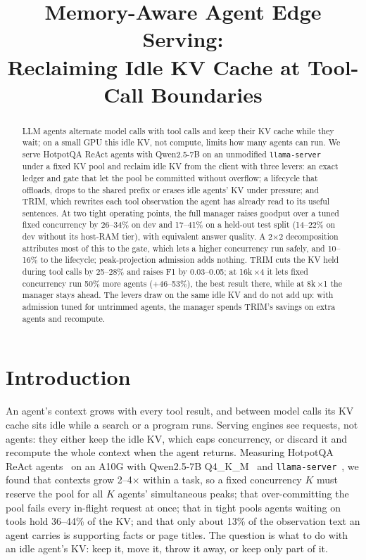 \documentclass[conference]{IEEEtran}
\newcommand{\K}{$K$}
\newcommand{\x}{$\times$}
\begin{document}
\title{Memory-Aware Agent Edge Serving:\\
\large Reclaiming Idle KV Cache at Tool-Call Boundaries}

\author{
}

\maketitle

\begin{abstract}
LLM agents alternate model calls with tool calls and keep their KV cache while they wait; on a small
GPU this idle KV, not compute, limits how many agents can run. We serve HotpotQA ReAct agents with
Qwen2.5-7B on an unmodified \texttt{llama-server} under a fixed KV pool and reclaim idle KV from the
client with three levers: an exact ledger and gate that let the pool be committed without overflow; a
lifecycle that offloads, drops to the shared prefix or erases idle agents' KV under pressure; and
TRIM, which rewrites each tool observation the agent has already read to its useful sentences. At
two tight operating points, the full manager raises goodput over a tuned fixed concurrency by
26--34\% on dev and 17--41\% on a held-out test split (14--22\% on dev without its host-RAM tier),
with equivalent answer quality. A 2\x2 decomposition attributes most of this to the gate, which lets
a higher concurrency run safely, and 10--16\% to the lifecycle; peak-projection admission adds
nothing. TRIM cuts the KV held during tool calls by 25--28\% and raises F1 by 0.03--0.05; at
16k\,\x4 it lets fixed concurrency run 50\% more agents (+46--53\%), the best result there, while at
8k\,\x1 the manager stays ahead. The levers draw on the same idle KV and do not add up: with
admission tuned for untrimmed agents, the manager spends TRIM's savings on extra agents and recompute.
\end{abstract}

\section{Introduction}

An agent's context grows with every tool result, and between model calls its KV cache sits idle
while a search or a program runs. Serving engines see requests, not agents: they either keep the
idle KV, which caps concurrency, or discard it and recompute the whole context when the agent
returns. Measuring HotpotQA~\cite{hotpotqa} ReAct agents~\cite{react} on an A10G with Qwen2.5-7B
Q4\_K\_M~\cite{qwen} and \texttt{llama-server}~\cite{llamacpp}, we found that contexts grow 2--4\x{}
within a task, so a fixed concurrency \K{} must reserve the pool for all \K{} agents' simultaneous
peaks; that over-committing the pool fails every in-flight request at once; that in tight pools
agents waiting on tools hold 36--44\% of the KV; and that only about 13\% of the observation text an
agent carries is supporting facts or page titles. The question is what to do with an idle agent's
KV: keep it, move it, throw it away, or keep only part of it.
\end{document}

